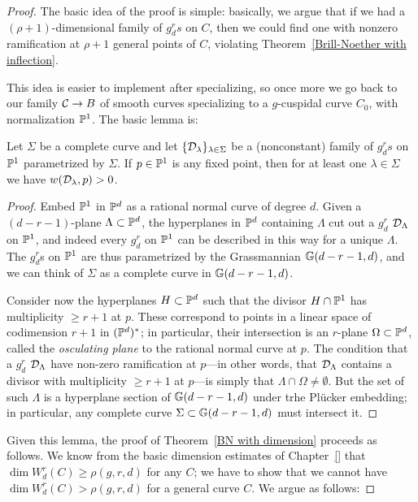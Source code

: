 \begin{proof}
The basic idea of the proof is simple: basically, we argue that if we had a $(\rho+1)$-dimensional family of $g^r_ds$ on $C$, then we could find one with nonzero ramification at $\rho+1$ general points of $C$, violating Theorem~\ref{Brill-Noether with inflection}.

This idea is easier to implement after specializing, so once more we go back to our family $\mathcal C \to B$ of smooth curves specializing to a $g$-cuspidal curve $C_0$, with normalization ${\mathbb P}^1$. The basic lemma is:

\begin{lemma}\label{forced ramification}
Let $\Sigma$ be a complete curve and let $\{ {\mathcal D}_\lambda \}_{\lambda \in \Sigma}$ be a (nonconstant) family of $g^r_ds$ on ${\mathbb P}^1$ parametrized by $\Sigma$. If $p \in {\mathbb P}^1$ is any fixed point, then for at least one $\lambda \in \Sigma$ we have $w({\mathcal D}_\lambda,p)>0$.
\end{lemma}

\begin{proof}
Embed ${\mathbb P}^1$ in ${\mathbb P}^d$ as a rational normal curve of degree $d$. Given a $(d-r-1)$-plane $\Lambda \subset {\mathbb P}^d$, the hyperplanes in ${\mathbb P}^d$ containing $\Lambda$ cut out a $g^r_d$ ${\mathcal D}_\Lambda$ on ${\mathbb P}^1$, and indeed every $g^r_d$ on ${\mathbb P}^1$ can be described in this way for a unique $\Lambda$. The $g^r_d$s on ${\mathbb P}^1$ are thus parametrized by the Grassmannian ${\mathbb G}(d-r-1,d)$, and we can think of $\Sigma$ as a complete curve in ${\mathbb G}(d-r-1,d)$.

Consider now the hyperplanes $H \subset {\mathbb P}^d$ such that the divisor $H \cap {\mathbb P}^1$ has multiplicity $\geq r+1$ at $p$. These correspond to points in a linear space of codimension $r+1$ in $({\mathbb P}^d)^*$; in particular, their intersection is an $r$-plane $\Omega \subset {\mathbb P}^d$, called the \emph{osculating plane} to the rational normal curve at $p$. The condition that a  $g^r_d$ ${\mathcal D}_\Lambda$ have non-zero ramification at $p$---in other words, that ${\mathcal D}_\Lambda$ contains a divisor with multiplicity $\geq r+1$ at $p$---is simply that $\Lambda \cap \Omega \neq \emptyset$. But the set of such $\Lambda$ is a hyperplane section of ${\mathbb G}(d-r-1,d)$ under trhe Pl\"ucker embedding; in particular, any complete curve $\Sigma \subset {\mathbb G}(d-r-1,d)$ must intersect it.
\end{proof}

Given this lemma, the proof of Theorem~\ref{BN with dimension} proceeds as follows. We know from the basic dimension estimates of Chapter~\ref{} that $\dim W^r_d(C) \geq \rho(g,r,d)$ for any $C$; we have to show that we cannot have $\dim W^r_d(C) > \rho(g,r,d)$ for a general curve $C$. We argue as follows:


\end{proof}
